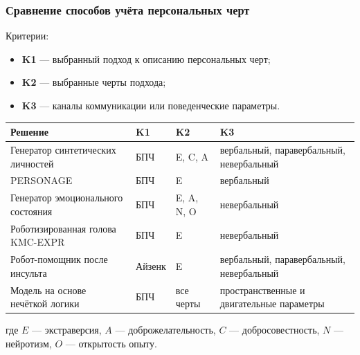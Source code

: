 \documentclass{beamer}
\let\raggedright=\RaggedRight
\begin{document}
\begin{frame}
    \frametitle{Сравнение способов учёта персональных черт}
    \footnotesize
    Критерии:
    \begin{itemize}
        \item[---] \textbf{K1} --- выбранный подход к описанию персональных черт;
        \item[---] \textbf{K2} --- выбранные черты подхода;
        \item[---] \textbf{K3} --- каналы коммуникации или поведенческие параметры.
    \end{itemize}

    \vspace{0.05cm}
    \begin{center}
        \scriptsize
        \setlength{\tabcolsep}{2pt}
        \renewcommand{\arraystretch}{1.2}
        \begin{tabularx}{\textwidth}{|
            >{\raggedright\arraybackslash}m{}|
            >{\centering\arraybackslash}m{}|
            >{\centering\arraybackslash}m{}|
            >{\raggedright\arraybackslash}X|
        }
                \hline
                \textbf{Решение} & \textbf{K1} & \textbf{K2} & \centering\arraybackslash\textbf{K3} \\
                \hline
                Генератор синтетических личностей &
                БПЧ &
                E, C, A &
                вербальный, паравербальный, невербальный \\
                \hline
                PERSONAGE &
                БПЧ &
                E &
                вербальный \\
                \hline
                Генератор эмоционального состояния &
                БПЧ &
                E, A, N, O &
                невербальный \\
                \hline
                Роботизированная голова KMC-EXPR &
                БПЧ &
                E &
                невербальный \\
                \hline
                Робот-помощник после инсульта &
                Айзенк &
                E &
                вербальный, паравербальный, невербальный \\
                \hline
                \rowcolor{LightCyan}
                Модель на основе нечёткой логики &
                БПЧ &
                все черты &
                пространственные и двигательные параметры \\
                \hline
        \end{tabularx}
    \end{center}

    \vfill
    \scriptsize
    где \(E\) --- экстраверсия, \(A\) --- доброжелательность, \(C\) --- добросовестность, \(N\) --- нейротизм, \(O\) --- открытость опыту.
\end{frame}
\end{document}
